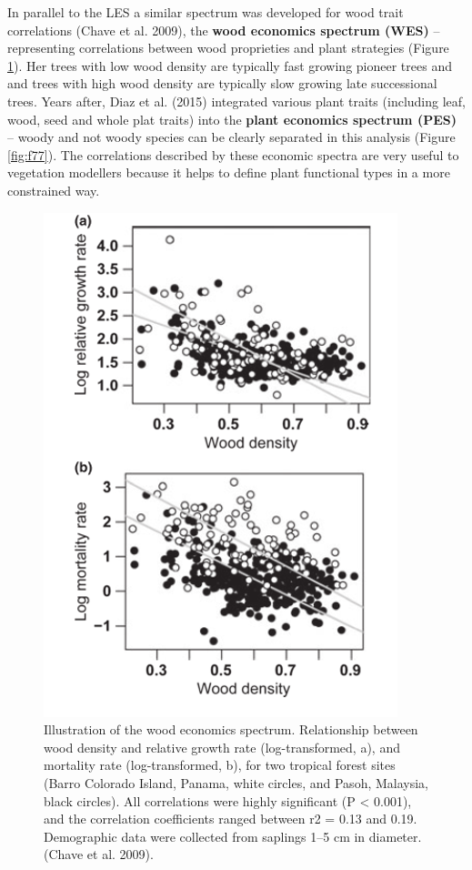 \documentclass[12pt,oneside]{book}
\begin{document}
In parallel to the LES a similar spectrum was developed for wood trait
correlations (Chave et al. 2009), the \textbf{wood economics spectrum
(WES)} -- representing correlations between wood proprieties and plant
strategies (Figure \ref{fig:f76}). Her trees with low wood density are
typically fast growing pioneer trees and and trees with high wood
density are typically slow growing late successional trees. Years after,
Diaz et al. (2015) integrated various plant traits (including leaf,
wood, seed and whole plat traits) into the \textbf{plant economics
spectrum (PES)} -- woody and not woody species can be clearly separated
in this analysis (Figure \ref{fig:f77}). The correlations described by
these economic spectra are very useful to vegetation modellers because
it helps to define plant functional types in a more constrained way.

\begin{figure}

{\centering \includegraphics[width=0.8\linewidth]{figures/chap7/f76_WES} 

}

\caption{Illustration of the wood economics spectrum. Relationship between wood density and relative growth rate (log-transformed, a), and mortality rate (log-transformed, b), for two tropical forest sites (Barro Colorado Island, Panama, white circles, and Pasoh, Malaysia, black circles). All correlations were highly significant (P < 0.001), and the correlation coefficients ranged between r2 = 0.13 and 0.19. Demographic data were collected from saplings 1–5 cm in diameter. (Chave et al. 2009).}\label{fig:f76}
\end{figure}
\end{document}
